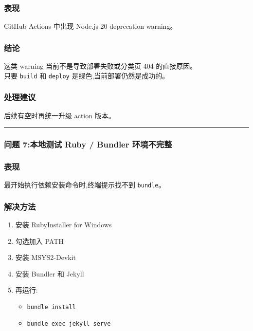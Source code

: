 \documentclass[lang=cn,scheme=chinese,color=blue,device=normal,toc=onecol,math=cm]{elegantbook}
\begin{document}
\subsubsection{表现}


GitHub Actions 中出现 Node.js 20 deprecation warning。\par


\subsubsection{结论}


这类 warning 当前不是导致部署失败或分类页 404 的直接原因。\\ 只要 \texttt{build} 和 \texttt{deploy} 是绿色,当前部署仍然是成功的。\par


\subsubsection{处理建议}


后续有空时再统一升级 action 版本。\par


\medskip\hrule\medskip


\subsubsection{问题 7:本地测试 Ruby /\allowbreak{} Bundler 环境不完整}


\subsubsection{表现}


最开始执行依赖安装命令时,终端提示找不到 \texttt{bundle}。\par


\subsubsection{解决方法}


\begin{enumerate}
\item 安装 RubyInstaller for Windows
\item 勾选加入 PATH
\item 安装 MSYS2-Devkit
\item 安装 Bundler 和 Jekyll
\item 再运行: 
\begin{itemize}
\item \texttt{bundle install}
\item \texttt{bundle exec jekyll serve}
\end{itemize}
\end{enumerate}
\end{document}
